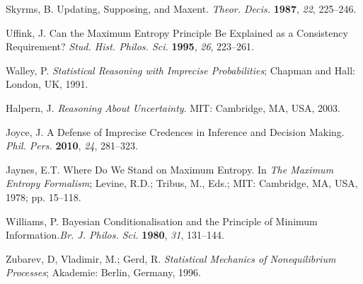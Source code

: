 \documentclass[entropy,article,accept,oneauthor,pdftex,12pt,a4paper]{mdpi}
\begin{document}
\begin{thebibliography}{----}
 Skyrms, B. Updating, Supposing, and Maxent. \emph{Theor. Decis.} {\bf1987}, \emph{22}, 225--246.

 Uffink, J. Can the Maximum Entropy Principle Be Explained as a Consistency Requirement? \emph{Stud. Hist. Philos. Sci.} {\bf1995}, \emph{26}, 223--261.

 Walley, P. \emph{Statistical Reasoning with Imprecise Probabilities}; Chapman and Hall: London, UK, 1991.

 Halpern, J. \emph{Reasoning About Uncertainty}.  MIT: Cambridge, MA, USA, 2003.

 Joyce, J. A Defense of Imprecise Credences in Inference and Decision Making. \emph{Phil. Pers.} {\bf2010}, \emph{24}, 281--323.

 Jaynes, E.T. Where Do We Stand on Maximum Entropy. In \emph{The Maximum Entropy Formalism};  Levine, R.D.;  Tribus, M., Eds.;  MIT: Cambridge, MA, USA, 1978; pp. 15--118.

 Williams, P. Bayesian Conditionalisation and the Principle of Minimum Information.\emph{Br. J. Philos. Sci.} {\bf1980}, \emph{31},  131--144.

 Zubarev, D, Vladimir, M.;  Gerd, R. \emph{Statistical Mechanics of Nonequilibrium Processes}; Akademie: Berlin, Germany, 1996.
\end{thebibliography}










% 

\end{document}
